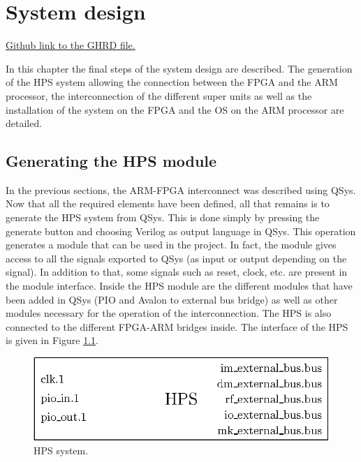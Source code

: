 \chapter{System design}

\href{https://github.com/AnotherGitAccount/TFE/blob/master/hardware/DE10_NANO_SoC_GHRD.v}{Github link to the GHRD file.}

In this chapter the final steps of the system design are described. The generation of the HPS 
system allowing the connection between the FPGA and the ARM processor, the interconnection of the 
different super units as well as the installation of the system on the FPGA and the OS on the 
ARM processor are detailed.

\section{Generating the HPS module}

In the previous sections, the ARM-FPGA interconnect was described using QSys. Now that all the 
required elements have been defined, all that remains is to generate the HPS system from QSys. 
This is done simply by pressing the generate button and choosing Verilog as output language in QSys.
This operation generates a module that can be used in the project. In fact, the module gives access 
to all the signals exported to QSys (as input or output depending on the signal). In addition to 
that, some signals such as reset, clock, etc. are present in the module interface. Inside the HPS 
module are the different modules that have been added in QSys (PIO and Avalon to external bus bridge) 
as well as other modules necessary for the operation of the interconnection. The HPS is also 
connected to the different FPGA-ARM bridges inside. The interface of the HPS is given in 
Figure \ref{fig:system/hps}.

\begin{figure}[H]
    \centering
    \includegraphics[scale=0.8]{Chapter6-System/res/hps.eps}
    \caption{HPS system.}
    \label{fig:system/hps}
\end{figure}

